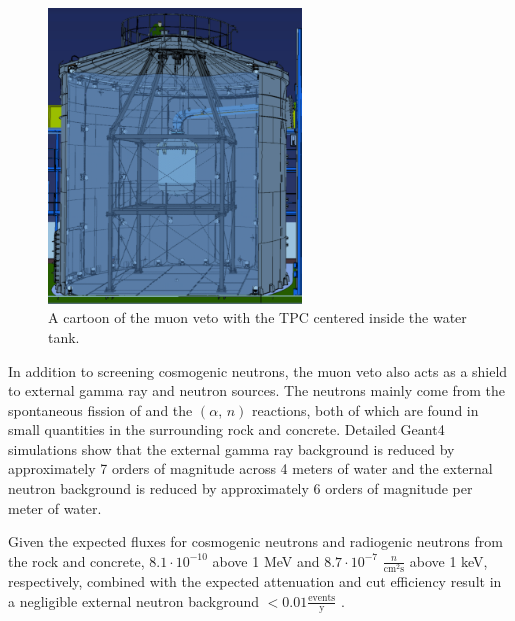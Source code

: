  
 \begin{figure}[t]
	\centering
	\includegraphics[width=0.6\textwidth]{cartoon_full_water_tank_muon_veto}
	\caption{A cartoon of the muon veto with the TPC centered inside the water tank.}
	\label{fig:cartoon_water_tank}
\end{figure}
 
 In addition to screening cosmogenic neutrons, the muon veto also acts as a shield to external gamma ray and neutron sources.  The neutrons mainly come from the spontaneous fission of  and the  $(\alpha, \, n)$ reactions, both of which are found in small quantities in the surrounding rock and concrete.  Detailed Geant4 simulations \cite{agostinelli2003geant4} show that the external gamma ray background is reduced by approximately 7 orders of magnitude across 4 meters of water and the external neutron background is reduced by approximately 6 orders of magnitude per meter of water.  
 
 Given the expected fluxes for cosmogenic neutrons and radiogenic neutrons from the rock and concrete, $8.1 \cdot 10^{-10}$ above 1 MeV \cite{mei2006muon} and $8.7 \cdot 10^{-7}$ $\frac{n}{\textrm{cm}^2 \textrm{s}}$ above 1 keV, respectively, combined with the expected attenuation and cut efficiency result in a negligible external neutron background $< 0.01 \frac{\textrm{events}}{\textrm{y}}$ \cite{aprile2016physics}.
 
